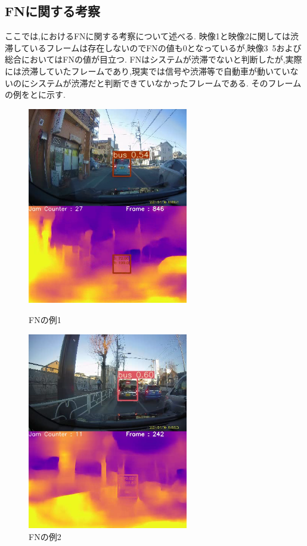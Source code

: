 \newpage
\subsection{FNに関する考察}
ここでは,におけるFNに関する考察について述べる.
映像1と映像2に関しては渋滞しているフレームは存在しないのでFNの値も0となっているが,映像3~5および総合においてはFNの値が目立つ.
FNはシステムが渋滞でないと判断したが,実際には渋滞していたフレームであり,現実では信号や渋滞等で自動車が動いていないのにシステムが渋滞だと判断できていなかったフレームである.
そのフレームの例をとに示す.

\begin{figure}[htbp]
  \begin{minipage}{0.5\hsize}
   \begin{center}
    \includegraphics[width=7cm]{figs/consider/fn01.png}
   \end{center}
   \caption{FNの例1}
   \label{fig:fn01}
  \end{minipage}
  \begin{minipage}{0.5\hsize}
  \begin{center}
   \includegraphics[width=7cm]{figs/consider/fn02.png}
  \end{center}
   \caption{FNの例2}
   \label{fig:fn02}
  \end{minipage}
 \end{figure}


